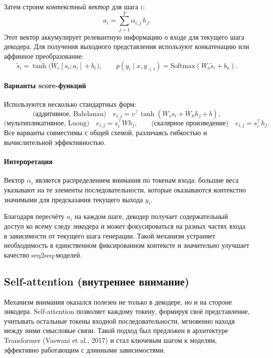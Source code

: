 \documentclass[12pt,a4paper]{article}
\begin{document}
Затем строим \emph{контекстный вектор} для шага $i$:
\[
a_i = \sum_{j=1}^{T} \alpha_{i,j}\, h_j.
\]
Этот вектор аккумулирует релевантную информацию о входе для текущего шага декодера. Для получения выходного представления используют конкатенацию или аффинное преобразование:
\[
\tilde{s}_i = \tanh\!\bigl(W_c [s_i; a_i] + b_c\bigr), \qquad
p(y_i \mid x,y_{<i}) = \mathrm{Softmax}(W_o \tilde{s}_i + b_o).
\]

\paragraph{Варианты score-функций}
Используются несколько стандартных форм:
\[
\text{(аддитивное, Bahdanau)}\quad
e_{i,j}=v^\top \tanh(W_s s_i + W_h h_j + b),
\]
\[
\text{(мультипликативное, Luong)}\quad
e_{i,j}= s_i^\top W h_j,
\qquad
\text{(скалярное произведение)}\quad
e_{i,j}= s_i^\top h_j.
\]
Все варианты совместимы с общей схемой, различаясь гибкостью и вычислительной эффективностью.

\paragraph{Интерпретация}
Вектор $\alpha_i$ является распределением внимания по токенам входа: большие веса указывают на те элементы последовательности, которые оказываются контекстно значимыми для предсказания текущего выхода $y_i$.

Благодаря пересчёту $a_i$ на каждом шаге, декодер получает содержательный доступ ко всему следу энкодера и может фокусироваться на разных частях входа в зависимости от текущего шага генерации. Такой механизм устраняет необходимость в единственном фиксированном контексте и значительно улучшает качество seq2seq-моделей.




\subsection{Self-attention (внутреннее внимание)}

Механизм внимания оказался полезен не только в декодере, но и на стороне энкодера.
Self-attention позволяет каждому токену, формируя своё представление, учитывать остальные токены входной последовательности, мгновенно находя между ними смысловые связи.
Такой подход был предложен в архитектуре Transformer (Vaswani et al., 2017) и стал ключевым шагом к моделям, эффективно работающим с длинными зависимостями.
\end{document}
